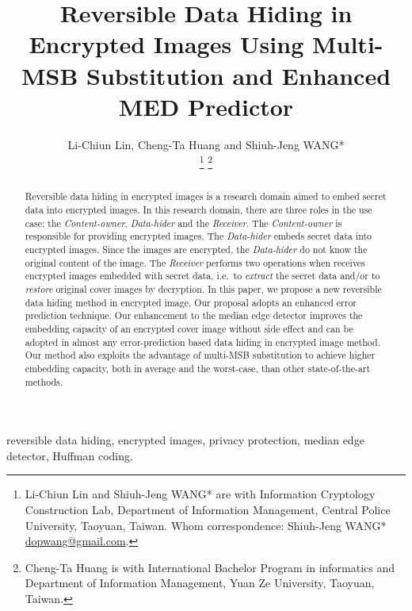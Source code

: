 \documentclass[journal]{IEEEtran}
\begin{document}
	
	\title{
		Reversible Data Hiding in Encrypted Images Using Multi-MSB Substitution and Enhanced MED Predictor
	}
	
	\author{
		Li-Chiun Lin,	Cheng-Ta Huang and	 Shiuh-Jeng WANG*
		
		\thanks{Li-Chiun Lin and Shiuh-Jeng WANG* are with Information Cryptology Construction Lab, Department of Information Management, Central Police University, Taoyuan, Taiwan. Whom correspondence: Shiuh-Jeng WANG* \url{dopwang@gmail.com}.}
		\thanks{Cheng-Ta Huang is with International Bachelor Program in informatics and Department of Information Management, Yuan Ze University, Taoyuan, Taiwan.}
	}
	
	\maketitle
	
	\begin{abstract}
		Reversible data hiding in encrypted images is a research domain aimed to embed secret data into encrypted images. 
		In this research domain, there are three roles in the use case: the \emph{Content-owner}, \emph{Data-hider} and the \emph{Receiver}.
		The \emph{Content-owner} is responsible for providing encrypted images.
		The \emph{Data-hider} embeds secret data into encrypted images. 
		Since the images are encrypted, the \emph{Data-hider} do not know the original content of the image. 
		The \emph{Receiver} performs two operations when receives encrypted images embedded with secret data, i.e.\ to \emph{extract} the secret data and/or to \emph{restore} original cover images by decryption.
		In this paper, we propose a new reversible data hiding method in encrypted image. 
		Our proposal adopts an enhanced error prediction technique. 
		Our enhancement to the median edge detector improves the embedding capacity of an encrypted cover image without side effect and can be adopted in almost any error-prediction based data hiding in encrypted image method.
		Our method also exploits the advantage of multi-MSB substitution to achieve higher embedding capacity, both in average and the worst-case, than other state-of-the-art methods.
	\end{abstract}
	
	\begin{IEEEkeywords}
		reversible data hiding, encrypted images, privacy protection, median edge detector, Huffman coding.
	\end{IEEEkeywords}
	
\end{document}
